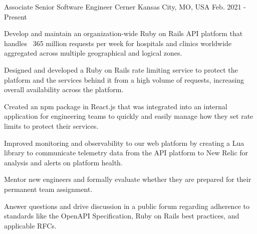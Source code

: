 

\begin{cventries}

  \cventry
    {Associate Senior Software Engineer} %
    {Cerner} %
    {Kansas City, MO, USA} %
    {Feb. 2021 - Present} %
    {
      \begin{cvitems} %
        \item {Develop and maintain an organization-wide Ruby on Rails API platform that handles ~365 million requests per week for hospitals and clinics worldwide aggregated across multiple geographical and logical zones.}
        \item {Designed and developed a Ruby on Rails rate limiting service to protect the platform and the services behind it from a high volume of requests, increasing overall availability across the platform.}
        \item {Created an npm package in React.js that was integrated into an internal application for engineering teams to quickly and easily manage how they set rate limits to protect their services.}
        \item {Improved monitoring and observability to our web platform by creating a Lua library to communicate telemetry data from the API platform to New Relic for analysis and alerts on platform health.}
        \item {Mentor new engineers and formally evaluate whether they are prepared for their permanent team assignment.}
        \item {Answer questions and drive discussion in a public forum regarding adherence to standards like the OpenAPI Specification, Ruby on Rails best practices, and applicable RFCs.}
      \end{cvitems}
    }


\end{cventries}

